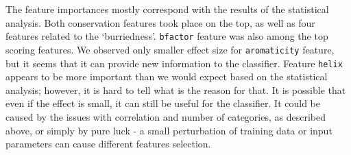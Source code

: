 The feature importances mostly correspond with the results of the statistical analysis. Both conservation features took place on the top, as well as four features related to the `burriedness'. \texttt{bfactor} feature was also among the top scoring features. We observed only smaller effect size for \texttt{aromaticity} feature, but it seems that it can provide new information to the classifier. Feature \texttt{helix} appears to be more important than we would expect based on the statistical analysis; however, it is hard to tell what is the reason for that. It is possible that even if the effect is small, it can still be useful for the classifier. It could be caused by the issues with correlation and number of categories, as described above, or simply by pure luck - a small perturbation of training data or input parameters can cause different features selection.

